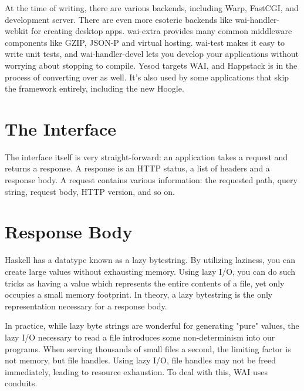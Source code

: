 At the time of writing, there are various backends, including Warp, FastCGI, and
development server. There are even more esoteric backends like wai-handler-webkit 
for creating desktop apps. wai-extra provides many common middleware components 
like GZIP, JSON-P and virtual hosting. wai-test makes it easy to write unit
tests, and wai-handler-devel lets you develop your
applications without worrying about stopping to compile. Yesod targets WAI, and
Happstack is in the process of converting over as well. It's also used by some
applications that skip the framework entirely, including the new Hoogle.


\section {The Interface}

The interface itself is very straight-forward: an application takes a request 
and returns a response. A response is an HTTP status, a list of headers and a 
response body. A request contains various information: the requested path, 
query string, request body, HTTP version, and so on.

\section {Response Body}

Haskell has a datatype known as a lazy bytestring. By utilizing laziness, you 
can create large values without exhausting memory. Using lazy I/O, you can do 
such tricks as having a value which represents the entire contents of a file, 
yet only occupies a small memory footprint. In theory, a lazy bytestring is the 
only representation necessary for a response body.

In practice, while lazy byte strings are wonderful for generating "pure" values, the
lazy I/O necessary to read a file introduces some non-determinism into our programs.
When serving thousands of small files a second, the limiting factor is not memory, but
file handles. Using lazy I/O, file handles may not be freed immediately, leading to
resource exhaustion. To deal with this, WAI uses conduits.

